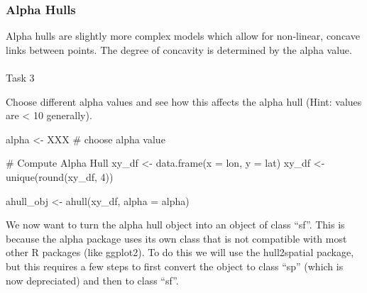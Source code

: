 \documentclass[
  letterpaper,
  DIV=11,
  numbers=noendperiod]{scrartcl}
\makeatletter
\let\oldparagraph\paragraph
\renewcommand{\paragraph}{
    \@ifstar
      \xxxParagraphStar
      \xxxParagraphNoStar
  }
\newcommand{\xxxParagraphStar}[1]{\oldparagraph*{#1}\mbox{}}
\newcommand{\xxxParagraphNoStar}[1]{\oldparagraph{#1}\mbox{}}
\newenvironment{Shaded}{\begin{snugshade}}{\end{snugshade}}
\newcommand{\AttributeTok}[1]{\textcolor[rgb]{0.40,0.45,0.13}{#1}}
\newcommand{\CommentTok}[1]{\textcolor[rgb]{0.37,0.37,0.37}{#1}}
\newcommand{\DecValTok}[1]{\textcolor[rgb]{0.68,0.00,0.00}{#1}}
\newcommand{\FunctionTok}[1]{\textcolor[rgb]{0.28,0.35,0.67}{#1}}
\newcommand{\NormalTok}[1]{\textcolor[rgb]{0.00,0.23,0.31}{#1}}
\newcommand{\OtherTok}[1]{\textcolor[rgb]{0.00,0.23,0.31}{#1}}
\makeatother
\begin{document}
\subsubsection{Alpha Hulls}\label{alpha-hulls}

Alpha hulls are slightly more complex models which allow for non-linear,
concave links between points. The degree of concavity is determined by
the alpha value.

\paragraph{Task 3}\label{task-3}

Choose different alpha values and see how this affects the alpha hull
(Hint: values are \textless{} 10 generally).

\begin{Shaded}
\begin{Highlighting}[]
\NormalTok{alpha }\OtherTok{\textless{}{-}}\NormalTok{ XXX }\CommentTok{\# choose alpha value}

\CommentTok{\# Compute Alpha Hull}
\NormalTok{xy\_df }\OtherTok{\textless{}{-}} \FunctionTok{data.frame}\NormalTok{(}\AttributeTok{x =}\NormalTok{ lon, }\AttributeTok{y =}\NormalTok{ lat)}
\NormalTok{xy\_df }\OtherTok{\textless{}{-}} \FunctionTok{unique}\NormalTok{(}\FunctionTok{round}\NormalTok{(xy\_df, }\DecValTok{4}\NormalTok{))}

\NormalTok{ahull\_obj }\OtherTok{\textless{}{-}} \FunctionTok{ahull}\NormalTok{(xy\_df, }\AttributeTok{alpha =}\NormalTok{ alpha)}
\end{Highlighting}
\end{Shaded}

We now want to turn the alpha hull object into an object of class
``sf''. This is because the alpha package uses its own class that is not
compatible with most other R packages (like ggplot2). To do this we will
use the hull2spatial package, but this requires a few steps to first
convert the object to class ``sp'' (which is now depreciated) and then
to class ``sf''.
\end{document}
